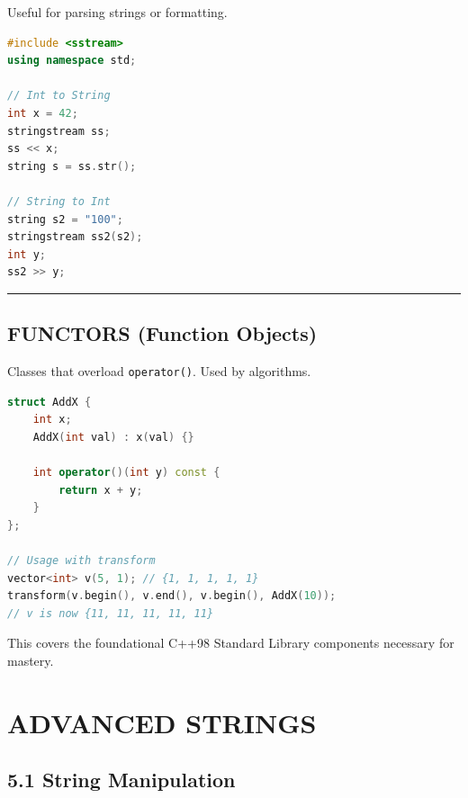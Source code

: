 Useful for parsing strings or formatting.

\begin{lstlisting}[language={C++}]
#include <sstream>
using namespace std;

// Int to String
int x = 42;
stringstream ss;
ss << x;
string s = ss.str();

// String to Int
string s2 = "100";
stringstream ss2(s2);
int y;
ss2 >> y;
\end{lstlisting}

\begin{center}\rule{0.5\linewidth}{0.5pt}\end{center}

\hypertarget{functors-function-objects}{%
\section{FUNCTORS (Function Objects)}\label{functors-function-objects}}

Classes that overload \passthrough{\lstinline!operator()!}. Used by
algorithms.

\begin{lstlisting}[language={C++}]
struct AddX {
    int x;
    AddX(int val) : x(val) {}
    
    int operator()(int y) const {
        return x + y;
    }
};

// Usage with transform
vector<int> v(5, 1); // {1, 1, 1, 1, 1}
transform(v.begin(), v.end(), v.begin(), AddX(10));
// v is now {11, 11, 11, 11, 11}
\end{lstlisting}

This covers the foundational C++98 Standard Library components necessary
for mastery.

\hypertarget{advanced-strings}{%
\chapter{ADVANCED STRINGS}\label{advanced-strings}}

\hypertarget{string-manipulation}{%
\section{5.1 String Manipulation}\label{string-manipulation}}

